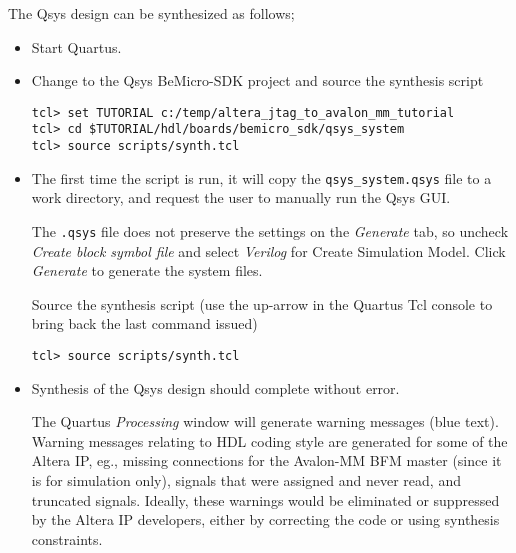 \documentclass[10pt,twoside]{article}
\begin{document}
The Qsys design can be synthesized as follows;
%
\begin{itemize}
\item Start Quartus.
\item Change to the Qsys BeMicro-SDK project and
source the synthesis script
%
\begin{verbatim}
tcl> set TUTORIAL c:/temp/altera_jtag_to_avalon_mm_tutorial
tcl> cd $TUTORIAL/hdl/boards/bemicro_sdk/qsys_system
tcl> source scripts/synth.tcl
\end{verbatim}
%
\item The first time the script is run, it will copy the
\verb+qsys_system.qsys+ file to a work directory, and request
the user to manually run the Qsys GUI.

The \verb+.qsys+ file does not preserve the settings on the 
{\em Generate} tab, so uncheck {\em Create block symbol file}
and select {\em Verilog} for {Create Simulation Model}.
Click {\em Generate} to generate the system files.

Source the synthesis script (use the up-arrow in the Quartus
Tcl console to bring back the last command issued)
%
\begin{verbatim}
tcl> source scripts/synth.tcl
\end{verbatim}
%
\item Synthesis of the Qsys design should complete without error.

The Quartus {\em Processing} window will generate warning messages
(blue text). Warning messages relating to HDL coding style are
generated for some of the Altera IP, eg., missing connections for
the Avalon-MM BFM master (since it is for simulation only),
signals that were assigned and never read, and truncated signals.
Ideally, these warnings would be eliminated or suppressed by the
Altera IP developers, either by correcting the code or using synthesis
constraints.
\end{itemize}
\end{document}
